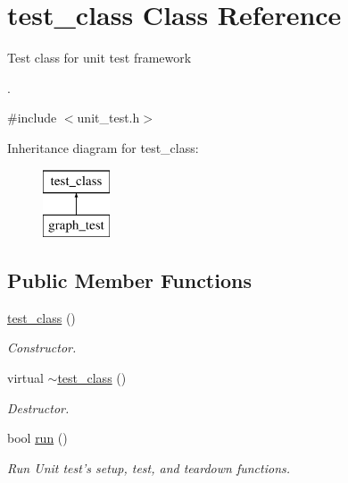 \hypertarget{classtest__class}{\section{test\+\_\+class Class Reference}
\label{classtest__class}
}


Test class for unit test framework \begin{DoxyVerb}\end{DoxyVerb}
.  




{\ttfamily \#include $<$unit\+\_\+test.\+h$>$}

Inheritance diagram for test\+\_\+class\+:\begin{figure}[H]
\begin{center}
\leavevmode
\includegraphics[height=2.000000cm]{classtest__class}
\end{center}
\end{figure}
\subsection*{Public Member Functions}
\begin{DoxyCompactItemize}
\item 
\hypertarget{classtest__class_aec748e707bc27bb28fe424722a975333}{\hyperlink{classtest__class_aec748e707bc27bb28fe424722a975333}{test\+\_\+class} ()}\label{classtest__class_aec748e707bc27bb28fe424722a975333}

\begin{DoxyCompactList}\small\item\em Constructor. \end{DoxyCompactList}\item 
\hypertarget{classtest__class_aadd18bb55da7e585c8628caa78b63c7b}{virtual \hyperlink{classtest__class_aadd18bb55da7e585c8628caa78b63c7b}{$\sim$test\+\_\+class} ()}\label{classtest__class_aadd18bb55da7e585c8628caa78b63c7b}

\begin{DoxyCompactList}\small\item\em Destructor. \end{DoxyCompactList}\item 
bool \hyperlink{classtest__class_a00fcb17fdfaf47816212afaeb108a743}{run} ()
\begin{DoxyCompactList}\small\item\em Run Unit test's setup, test, and teardown functions. \end{DoxyCompactList}\end{DoxyCompactItemize}
